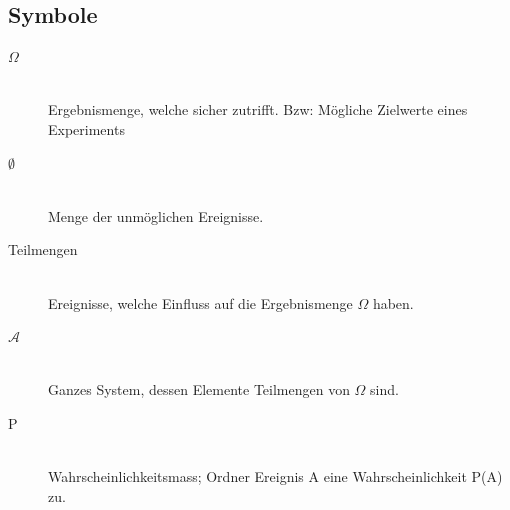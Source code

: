 \subsection{Symbole}

\begin{description}
	\item[$\Omega$] \hfill \\
		Ergebnismenge, welche sicher zutrifft. Bzw: Mögliche Zielwerte eines Experiments
	\item[$\emptyset$] \hfill \\
		Menge der unmöglichen Ereignisse.
	\item[Teilmengen] \hfill \\
		Ereignisse, welche Einfluss auf die Ergebnismenge $\Omega$ haben.
	\item[$\mathcal{A}$] \hfill \\
		Ganzes System, dessen Elemente Teilmengen von $\Omega$ sind.
	\item[P] \hfill \\
		Wahrscheinlichkeitsmass; Ordner Ereignis A eine Wahrscheinlichkeit P(A) zu.
\end{description}


